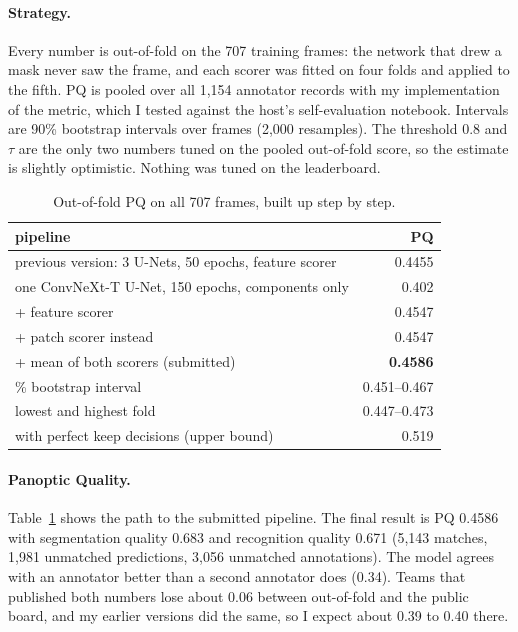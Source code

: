 \documentclass[sigconf]{acmart}
\begin{document}
\paragraph{Strategy.} Every number is out-of-fold on the 707 training frames: the network that
drew a mask never saw the frame, and each scorer was fitted on four folds and applied to the
fifth. PQ is pooled over all 1,154 annotator records with my implementation of the metric, which I
tested against the host's self-evaluation notebook. Intervals are 90\% bootstrap intervals over
frames (2,000 resamples). The threshold 0.8 and $\tau$ are the only two numbers tuned on the
pooled out-of-fold score, so the estimate is slightly optimistic. Nothing was tuned on the
leaderboard.

\begin{table}[t]
\caption{Out-of-fold PQ on all 707 frames, built up step by step.}
\label{tab:main}
\small
\begin{tabular}{@{}lr@{}}
\toprule
pipeline & PQ \\
\midrule
previous version: 3 U-Nets, 50 epochs, feature scorer & 0.4455 \\
one ConvNeXt-T U-Net, 150 epochs, components only & 0.402 \\
\quad + feature scorer & 0.4547 \\
\quad + patch scorer instead & 0.4547 \\
\quad + mean of both scorers (submitted) & \textbf{0.4586} \\
\quad\quad 90\% bootstrap interval & 0.451--0.467 \\
\quad\quad lowest and highest fold & 0.447--0.473 \\
\quad with perfect keep decisions (upper bound) & 0.519 \\
\bottomrule
\end{tabular}
\end{table}

\paragraph{Panoptic Quality.} Table~\ref{tab:main} shows the path to the submitted pipeline. The
final result is PQ 0.4586 with segmentation quality 0.683 and recognition quality 0.671 (5,143
matches, 1,981 unmatched predictions, 3,056 unmatched annotations). The model agrees with an
annotator better than a second annotator does (0.34). Teams that published both numbers lose
about 0.06 between out-of-fold and the public board, and my earlier versions did the same, so I
expect about 0.39 to 0.40 there.
\end{document}
